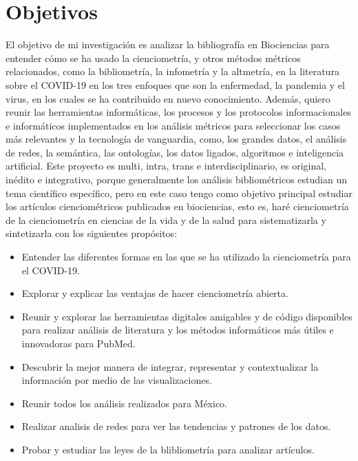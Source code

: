 \documentclass[../Main.tex]{subfiles}
\begin{document}
\section{Objetivos}
\noindent
El objetivo de mi investigación es analizar la bibliografía en Biociencias para entender cómo se ha usado la cienciometría, y otros métodos métricos relacionados, como la bibliometría, la infometría y la altmetría, en la literatura sobre el COVID-19 en los tres enfoques que son la enfermedad, la pandemia y el virus, en los cuales se ha contribuido en nuevo conocimiento.  
Además, quiero reunir las herramientas informáticas, los procesos y los protocolos informacionales e informáticos implementados en los análisis métricos para seleccionar los casos más relevantes y la tecnología de vanguardia, como, los grandes datos, el análisis de redes, la semántica, las ontologías, los datos ligados, algoritmos e inteligencia artificial.  
Este proyecto es multi, intra, trans e interdisciplinario, es original, inédito e integrativo, porque generalmente los análisis bibliométricos estudian un tema científico específico, pero en este caso tengo como objetivo principal estudiar los artículos cienciométricos publicados en biociencias, esto es, haré cienciometría de la cienciometría en ciencias de la vida y de la salud para sistematizarla y sintetizarla con los siguientes propósitos: 
\begin{itemize}
    \item Entender las diferentes formas en las que se ha utilizado la cienciometría para el COVID-19.
    \item Explorar y explicar las ventajas de hacer cienciometría abierta.
    \item Reunir y explorar las herramientas digitales amigables  y de código disponibles para realizar análisis de literatura y los métodos informáticos más útiles e innovadoras para PubMed.
    \item Descubrir la mejor manera de integrar, representar y contextualizar la información por medio de las visualizaciones.
    \item Reunir todos los análisis realizados para México.
    \item Realizar analisis de redes para ver las tendencias y patrones de los datos.
    \item Probar y estudiar las leyes de la blibliometría para analizar artículos. 
\end{itemize}
\end{document}
